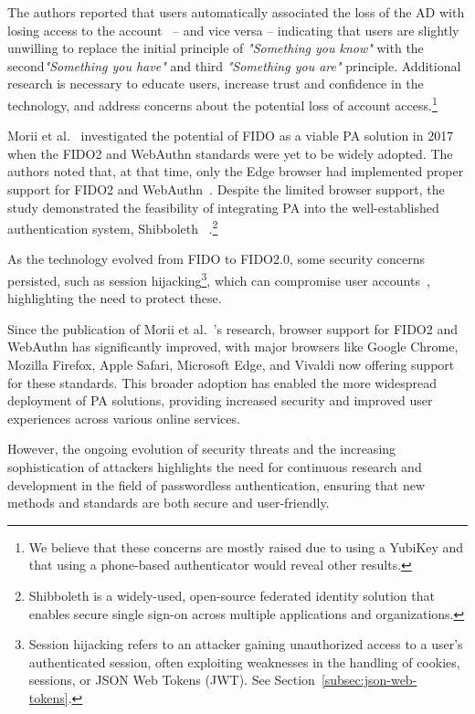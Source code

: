 The authors reported that users automatically associated the loss of the AD with
losing access to the account~\cite{ghrobany2020fido2} -- and vice versa --
indicating that users are slightly unwilling to replace the initial principle of
\textit{"Something you know"} with the second\textit{"Something you have"} and
third \textit{"Something you are"} principle.
Additional research is necessary to educate users, increase trust and confidence
in the technology, and address concerns about the potential loss of account
access.\footnote{
  We believe that these concerns are mostly raised due to using a YubiKey
  and that using a phone-based authenticator would reveal other results.
}

Morii et al.~\cite{morii2017research} investigated the potential of FIDO as a
viable PA solution in 2017 when the FIDO2 and WebAuthn standards were yet to be
widely adopted.
The authors noted that, at that time, only the Edge browser had implemented
proper support for FIDO2 and WebAuthn~\cite{morii2017research}.
Despite the limited browser support, the study demonstrated the feasibility
of integrating PA into the well-established authentication system, Shibboleth
~\cite{shibboleth, morii2017research}.\footnote{
  Shibboleth is a widely-used, open-source federated identity solution that
  enables secure single sign-on across multiple applications and organizations.
}


As the technology evolved from FIDO to FIDO2.0, some security concerns
persisted, such as session hijacking\footnote{
  Session hijacking refers to an attacker gaining unauthorized access to a
  user's authenticated session, often exploiting weaknesses in the handling of
  cookies, sessions, or JSON Web Tokens (JWT).
  See Section~\ref{subsec:json-web-tokens}.
}, which can compromise user accounts~\cite{morii2017research}, highlighting
the need to protect these.

Since the publication of Morii et al.~'s research, browser support for FIDO2 and
WebAuthn has significantly improved, with major browsers like Google Chrome,
Mozilla Firefox, Apple Safari, Microsoft Edge, and Vivaldi now offering
support for these standards.
This broader adoption has enabled the more widespread deployment of PA solutions,
providing increased security and improved user experiences across various online
services.

However, the ongoing evolution of security threats and the increasing
sophistication of attackers highlights the need for continuous research and
development in the field of passwordless authentication, ensuring that new
methods and standards are both secure and user-friendly.

